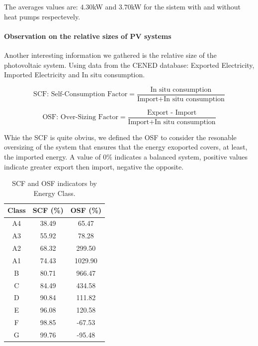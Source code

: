 The averages values are: $4.30$kW and $3.70$kW for the sistem with and without heat pumps respectevely.

\paragraph{Observation on the relative sizes of PV systems}

Another interesting information we gathered is the relative size of the photovoltaic system. 
Using data from the CENED database: Exported Electricity, Imported Electricity and In situ consumption.

\begin{equation}
    \text{SCF: Self-Consumption Factor} = \frac{\text{In situ consumption}}{\text{Import} + \text{In situ consumption}}
\end{equation}

\begin{equation}
    \text{OSF: Over-Sizing Factor} = \frac{\text{Export - Import}}{\text{Import} + \text{In situ consumption}}
\end{equation}

Whie the SCF is quite obvius, 
we defined the OSF to consider the resonable oversizing of the system that ensures that the energy exoported covers, at least, the imported energy.
A value of $0\%$ indicates a balanced system, positive values indicate greater export then import, negative the opposite.

\begin{table}[H]
    \centering
    \begin{tabular}{|c|c|c|}
        \hline
        \textbf{Class} & \textbf{SCF (\%)} & \textbf{OSF (\%)} \\
        \hline
        A4 & 38.49 & 65.47 \\
        A3 & 55.92 & 78.28 \\
        A2 & 68.32 & 299.50 \\
        A1 & 74.43 & 1029.90 \\
        B  & 80.71 & 966.47 \\
        C  & 84.49 & 434.58 \\
        D  & 90.84 & 111.82 \\
        E  & 96.08 & 120.58 \\
        F  & 98.85 & -67.53 \\
        G  & 99.76 & -95.48 \\
        \hline
    \end{tabular}
    \caption{SCF and OSF indicators by Energy Class.}
    \label{tab:pv_scf_osf}
\end{table}

